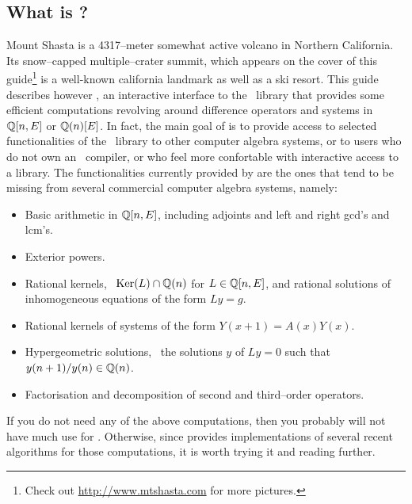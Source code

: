 \subsection{What is \shasta?}
Mount Shasta is a 4317--meter somewhat active volcano in Northern California.
Its snow--capped multiple--crater summit, which appears on the cover of this
guide\footnote{Check out \url{http://www.mtshasta.com} for more pictures.}
is a well-known california landmark as well as a ski resort.
This guide describes however \shasta, an interactive interface to
the \sumit~library that provides some efficient computations revolving
around difference operators and systems in ${\mathbb{Q}}[n,E]$ or ${\mathbb{Q}}(n)[E]$. In fact, the
main goal of \shasta{} is to provide access to selected functionalities
of the \sumit~library to other computer algebra systems, or to users
who do not own an \asharp~compiler, or who feel more confortable with
interactive access to a library. The functionalities currently provided
by \shasta{} are the ones that tend to be missing from several commercial
computer algebra systems, namely:
\begin{itemize}
\item
Basic arithmetic in ${\mathbb{Q}}[n,E]$, including
adjoints and left and right gcd's and lcm's.
\item
Exterior powers.
\item
Rational kernels, \ie~${\rm Ker}(L) \cap {\mathbb{Q}}(n)$ for $L \in {\mathbb{Q}}[n,E]$,
and rational solutions of inhomogeneous equations of the form
$L y = g$. %
\item
Rational kernels of systems of the form $Y(x+1) = A(x) Y(x)$.
\item
Hypergeometric solutions, \ie~the solutions $y$ of $L y = 0$
such that $y(n+1)/y(n) \in {\mathbb{Q}}(n)$.
\item
Factorisation and decomposition of second and third--order operators.
\end{itemize}
If you do not need any of the above computations, then
you probably will not have much use for \shasta.
Otherwise, since \shasta{} provides implementations of several recent
algorithms for those computations, it is worth trying it and
reading further.


